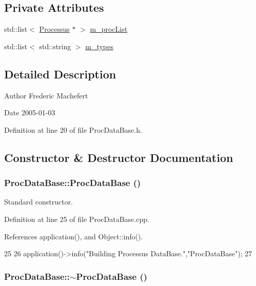 \subsection*{Private Attributes}
\begin{DoxyCompactItemize}
\item 
std::list$<$ \hyperlink{classProcessus}{Processus} $\ast$ $>$ \hyperlink{classProcDataBase_a9b7458b811b826c5d264b436c7a391c4}{m\_\-procList}
\item 
std::list$<$ std::string $>$ \hyperlink{classProcDataBase_a94063cebf50be9a12b8bd9f70e410ed5}{m\_\-types}
\end{DoxyCompactItemize}


\subsection{Detailed Description}
\begin{DoxyAuthor}{Author}
Frederic Machefert 
\end{DoxyAuthor}
\begin{DoxyDate}{Date}
2005-\/01-\/03 
\end{DoxyDate}


Definition at line 20 of file ProcDataBase.h.

\subsection{Constructor \& Destructor Documentation}
\hypertarget{classProcDataBase_a82163dfca2df460ba2ea1559ffa72179}{
\subsubsection[{ProcDataBase}]{\setlength{\rightskip}{0pt plus 5cm}ProcDataBase::ProcDataBase ()}}
\label{classProcDataBase_a82163dfca2df460ba2ea1559ffa72179}


Standard constructor. 

Definition at line 25 of file ProcDataBase.cpp.

References application(), and Object::info().


\begin{DoxyCode}
25                              {
26   application()->info("Building Processus DataBase.","ProcDataBase");
27 }
\end{DoxyCode}
\hypertarget{classProcDataBase_a65ec1212978a4996b5132bfaf1d0738d}{
\subsubsection[{$\sim$ProcDataBase}]{\setlength{\rightskip}{0pt plus 5cm}ProcDataBase::$\sim$ProcDataBase ()}}
\label{classProcDataBase_a65ec1212978a4996b5132bfaf1d0738d}


